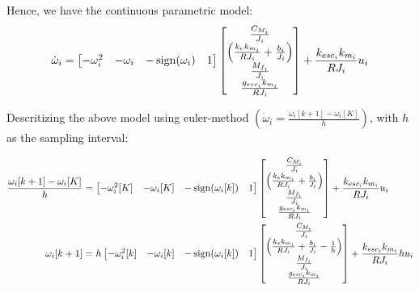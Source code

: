 Hence, we have the continuous parametric model:
$$ \dot \omega_i = \begin{bmatrix}
    - \omega_i^2 & - \omega_i  & - \operatorname{sign}(\omega_i) & 1
\end{bmatrix}
\begin{bmatrix}
    \frac{C_{M_i}}{J_i} \\
    \left(\frac{k_ek_{m_i}}{R J_i} + \frac{b_i}{J_i} \right) \\
    \frac{M_{f_i}}{J_i}\\
    \frac{g_{esc_i}k_{m_i}}{R J_i}
\end{bmatrix}
    + \frac{k_{esc_i}k_{m_i}}{R J_i}  u_i $$

Descritizing the above model using euler-method $\left(\dot \omega_i = \frac{\omega_i[k+1] - \omega_i[K]}{h}\right)$, with $h$ as the sampling interval:

\begin{align*}
    \frac{\omega_i[k+1] - \omega_i[K]}{h} &=
    \begin{bmatrix} - \omega_i^2[K] & - \omega_i[K]  & - \operatorname{sign}(\omega_i[k]) & 1 \end{bmatrix}
    \begin{bmatrix}
        \frac{C_{M_i}}{J_i} \\
        \left(\frac{k_ek_{m_i}}{R J_i} + \frac{b_i}{J_i} \right) \\
        \frac{M_{f_i}}{J_i}\\
        \frac{g_{esc_i}k_{m_i}}{R J_i}
    \end{bmatrix}
    + \frac{k_{esc_i}k_{m_i}}{R J_i}  u_i\\
    \omega_i[k+1] &= h \begin{bmatrix} - \omega_i^2[k] & - \omega_i[k]  & - \operatorname{sign}(\omega_i[k]) & 1 \end{bmatrix}
    \begin{bmatrix}
        \frac{C_{M_i}}{J_i} \\
        \left(\frac{k_ek_{m_i}}{R J_i} + \frac{b_i}{J_i} - \frac{1}{h}\right) \\
        \frac{M_{f_i}}{J_i}\\
        \frac{g_{esc_i}k_{m_i}}{R J_i}
    \end{bmatrix}
    + \frac{k_{esc_i}k_{m_i}}{R J_i}  h u_i
\end{align*}


